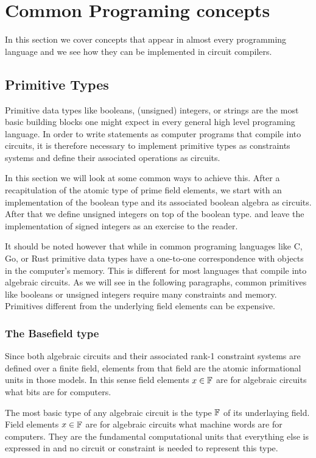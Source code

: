 \section{Common Programing concepts}
In this section we cover concepts that appear in almost every programming language and we see how they can be implemented in circuit compilers. 
\subsection{Primitive Types} 
Primitive data types like booleans, (unsigned) integers, or strings  are the most basic building blocks one might expect in every general high level programing language. In order to write statements as computer programs that compile into circuits, it is therefore necessary to implement primitive types as constraints systems and define their associated operations as circuits.

In this section we will look at some common ways to achieve this. After a recapitulation of the atomic type of prime field elements, we start with an implementation of the boolean type and its associated boolean algebra as circuits. After that we define unsigned integers on top of the boolean type. and leave the implementation of signed integers as an exercise to the reader. 

It should be noted however that while in common programing languages like C, Go, or Rust primitive data types have a one-to-one correspondence with objects in the computer's memory. This is different for most languages that compile into algebraic circuits. As we will see in the following paragraphs, common primitives like booleans or unsigned integers require many constraints and memory. Primitives different from the underlying field elements can be expensive.

\subsubsection{The Basefield type} 
Since both algebraic circuits and their associated rank-1 constraint systems are defined over a finite field, elements from that field are the atomic informational units in those models. In this sense field elements $x\in \mathbb{F}$ are for algebraic circuits what bits are for computers. 

The most basic type of any algebraic circuit is the type $\mathbb{F}$ of its underlaying field. Field elements $x\in\mathbb{F}$ are for algebraic circuits what machine words are for computers. They are the fundamental computational units that everything else is expressed in and no circuit or constraint is needed to represent this type. 

